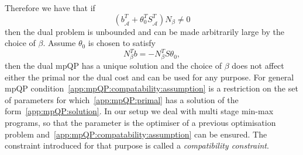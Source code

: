 \documentclass[journal]{IEEEtran}
\theoremstyle{remark}
\theoremstyle{definition}
\begin{document}
%
Therefore we have that if
%
\begin{equation}
  (b^T_{\hat{\mathcal A}}+\theta^T_0 S^T_{\hat{\mathcal A}})N_\beta \neq 0
\end{equation}
%
then the dual problem is unbounded and can be made arbitrarily large by the choice of $\beta$. 
%
Assume $\theta_0$ is chosen to satisfy 
%
\begin{equation}\label{app:mpQP:compatability:assumption}
  N_\beta^Tb = -N_\beta^TS\theta_0,
\end{equation} 
%
then the dual mpQP has a unique solution and the choice of $\beta$ does not affect either the primal nor the 
dual cost and can be used for any purpose. 
%
For general mpQP condition~\eqref{app:mpQP:compatability:assumption} is a restriction on the set
of parameters for which~\eqref{app:mpQP:primal} has a solution of the form~\eqref{app:mpQP:solution}.
%
In our setup we deal with multi stage min-max programs, so that the parameter is the optimiser 
of a previous optimisation problem and~\eqref{app:mpQP:compatability:assumption} can be ensured. 
%
The constraint introduced for that purpose is called a \emph{compatibility constraint}. 
\end{document}
